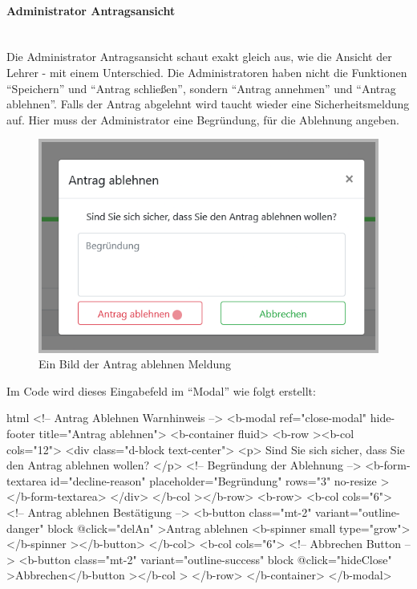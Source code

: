 \paragraph{Administrator Antragsansicht}
~\\
Die Administrator Antragsansicht schaut exakt gleich aus, wie die Ansicht der Lehrer - mit einem Unterschied. Die Administratoren haben nicht die Funktionen \enquote{Speichern} und \enquote{Antrag schließen}, sondern \enquote{Antrag annehmen} und \enquote{Antrag ablehnen}. Falls der Antrag abgelehnt wird taucht wieder eine Sicherheitsmeldung auf. Hier muss der Administrator eine Begründung, für die Ablehnung angeben. 
\begin{figure}[H]
	\centering
	\includegraphics[width=0.6\linewidth]{images/website/admin_antrag_schiessen}
	\caption[Aktiv]{Ein Bild der Antrag ablehnen Meldung}
	\label{fig:adminclose}
\end{figure}
Im Code wird dieses Eingabefeld im \enquote{Modal} wie folgt erstellt:
\begin{code}{html}
	<!-- Antrag Ablehnen Warnhinweis -->
    <b-modal ref="close-modal" hide-footer title="Antrag ablehnen">
      <b-container fluid>
        <b-row
          ><b-col cols="12">
            <div class="d-block text-center">
              <p>
                Sind Sie sich sicher, dass Sie den Antrag ablehnen wollen?
              </p>
              <!-- Begründung der Ablehnung -->
              <b-form-textarea
                id="decline-reason"
                placeholder="Begründung"
                rows="3"
                no-resize
              ></b-form-textarea>
            </div> </b-col
        ></b-row>
        <b-row>
          <b-col cols="6">
            <!-- Antrag ablehnen Bestätigung -->
            <b-button class="mt-2" variant="outline-danger" block @click="delAn"
              >Antrag ablehnen <b-spinner small type="grow"></b-spinner
            ></b-button>
          </b-col>
          <b-col cols="6">
            <!-- Abbrechen Button -->
            <b-button
              class="mt-2"
              variant="outline-success"
              block
              @click="hideClose"
              >Abbrechen</b-button
            ></b-col
          >
        </b-row>
      </b-container>
    </b-modal>
\end{code}
	\label{list:badgebsp} ~\\
\newpage
